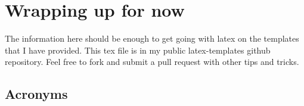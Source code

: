 \documentclass[11pt,a4paper]{article}
\begin{document}
\section{Wrapping up for now}
The information here should be enough to get going with latex on the templates that I have provided. This tex file is in my public latex-templates github repository. Feel free to fork and submit a pull request with other tips and tricks. 


\newpage


\begin{appendices}




    \setcounter{section}{0}
    \renewcommand{\thesection}{\Roman{section}}


    \section{Acronyms}
    \printnoidxglossary[title={}]


\end{appendices}
\end{document}
